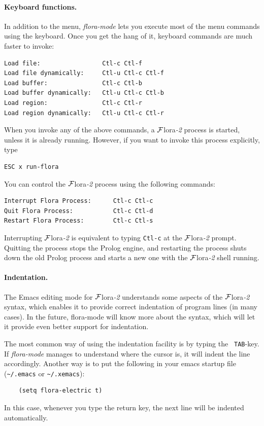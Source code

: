 \documentclass[11pt]{article}
\newcommand{\FLSYSTEM}{{\mbox{\sc ${\cal F}${lora}\rm\emph{-2}}}\xspace}
\begin{document}
\paragraph{Keyboard functions.}
In addition to the menu, \emph{flora-mode} lets you execute most of the
menu commands using the keyboard. Once you get the hang of it, keyboard
commands are much faster to invoke:
\begin{verbatim}
Load file:                 Ctl-c Ctl-f
Load file dynamically:     Ctl-u Ctl-c Ctl-f
Load buffer:               Ctl-c Ctl-b
Load buffer dynamically:   Ctl-u Ctl-c Ctl-b
Load region:               Ctl-c Ctl-r
Load region dynamically:   Ctl-u Ctl-c Ctl-r
\end{verbatim}
When you invoke any of the above commands, a \FLSYSTEM process is started,
unless it is already running. However, if you want to invoke this process
explicitly, type
\begin{verbatim}
ESC x run-flora  
\end{verbatim}
You can control the \FLSYSTEM process using the following commands:
\begin{verbatim}
Interrupt Flora Process:      Ctl-c Ctl-c
Quit Flora Process:           Ctl-c Ctl-d
Restart Flora Process:        Ctl-c Ctl-s
\end{verbatim}
Interrupting \FLSYSTEM is equivalent to typing {\tt Ctl-c} at the \FLSYSTEM
prompt. Quitting the process stops the Prolog engine, and restarting the
process shuts down the old Prolog process and starts a new one with the \FLSYSTEM
shell running. 

\paragraph{Indentation.}
The Emacs editing mode for \FLSYSTEM
understands some aspects of the \FLSYSTEM syntax, which
enables it to provide correct indentation of program lines (in many cases).
In the future, flora-mode will know more about the syntax, which will let
it provide even better support for indentation.

The most common way of using the indentation facility is by typing the {\tt
  TAB}-key. If \emph{flora-mode} manages to understand where the cursor is,
it will indent the line accordingly. Another way is to put the following in
your emacs startup file (\verb|~/.emacs| or \verb|~/.xemacs|):
\begin{verbatim}
    (setq flora-electric t)  
\end{verbatim}
In this case, whenever you type the return key, the next line will be
indented automatically.
\end{document}
